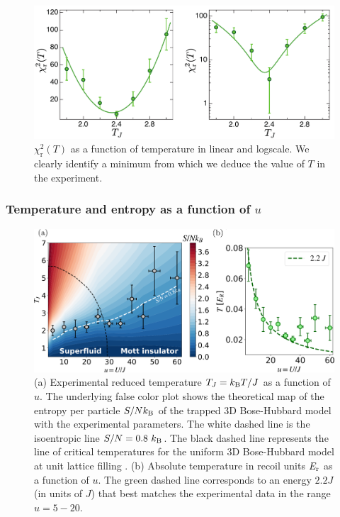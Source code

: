 \begin{figure}
    \centering
    \includegraphics[width=1\textwidth]{Fig/Chapter3/chi_square.pdf}
    \caption[$\chi_{\mathrm{r}}^{2}(T)$ as a function of temperature in linear and logscale]{$\chi_{\mathrm{r}}^{2}(T)$ as a function of temperature in linear and logscale. We clearly identify a minimum from which we deduce the value of $T$ in the experiment.}
    \label{fig:chi_vs_T}
\end{figure}

\subsubsection{Temperature and entropy as a function of $u$}

\begin{figure}
    \centering
    \includegraphics[width=\textwidth]{Fig/Chapter3/temperature.png}
    \caption[Experimental reduced temperature $T_J=\kB T/J$ as a function of $u$ and absolute temperature in recoil units $E_{\rm{r}}$ as a function of $u$]{(a) Experimental reduced temperature $T_J=\kB T/J$ as a function of $u$. The underlying false color plot shows the theoretical map of the entropy per particle $S/N k_{\mathrm{B}}$ of the trapped 3D Bose-Hubbard model with the experimental parameters. The white dashed line is the isoentropic line $S/N=0.8 \ \kB$. The black dashed line represents the line of critical temperatures for the uniform 3D Bose-Hubbard model at unit lattice filling \cite{capogrosso2007phase}. (b) Absolute temperature in recoil units $E_{\rm{r}}$ as a function of $u$. The green dashed line corresponds to an energy $2.2 J$ (in units of $J$) that best matches the experimental data in the range $u=5-20$.}
    \label{fig:T_vs_u}
\end{figure}

